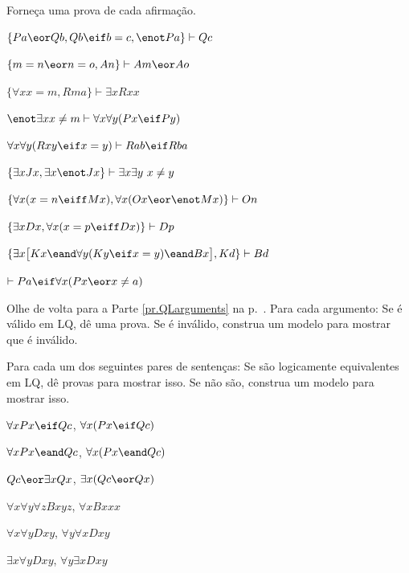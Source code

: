 \problempart
\label{pr.identity}
Forneça uma prova de cada afirmação.
\begin{earg}
\item $\{Pa \eor Qb, Qb \eif b=c, \enot Pa\}\vdash Qc$
\item $\{m=n \eor n=o, An\}\vdash Am \eor Ao$
\item $\{\forall x x=m, Rma\}\vdash \exists x Rxx$
\item $\enot \exists x x \neq m \vdash \forall x\forall y (Px \eif Py)$
\item $\forall x\forall y(Rxy \eif x=y)\vdash Rab \eif Rba$
\item $\{\exists x Jx, \exists x \enot Jx\}\vdash \exists x \exists y\ x\neq y$
\item $\{\forall x(x=n \eiff Mx), \forall x(Ox \eor \enot Mx)\}\vdash On$
\item $\{\exists x Dx, \forall x(x=p \eiff Dx)\}\vdash Dp$
\item $\{\exists x\bigl[Kx \eand \forall y(Ky \eif x=y) \eand Bx\bigr], Kd\}\vdash Bd$
\item $\vdash Pa \eif \forall x(Px \eor x \neq a)$
\end{earg}



\problempart
Olhe de volta para a Parte \ref{pr.QLarguments} na p.~\pageref{pr.QLarguments}. Para cada argumento: Se é válido em LQ, dê uma prova. Se é inválido, construa um modelo para mostrar que é inválido.

\solutions
\problempart
\label{pr.QLequivornot}
Para cada um dos seguintes pares de sentenças: Se são logicamente equivalentes em LQ, dê provas para mostrar isso. Se não são, construa um modelo para mostrar isso.
\begin{earg}
\item $\forall x Px \eif Qc$, $\forall x (Px \eif Qc)$
\item $\forall x Px \eand Qc$, $\forall x (Px \eand Qc)$
\item $Qc \eor \exists x Qx$, $\exists x (Qc \eor Qx)$
\item $\forall x\forall y \forall z Bxyz$, $\forall x Bxxx$
\item $\forall x\forall y Dxy$, $\forall y\forall x Dxy$
\item $\exists x\forall y Dxy$, $\forall y\exists x Dxy$
\end{earg}


